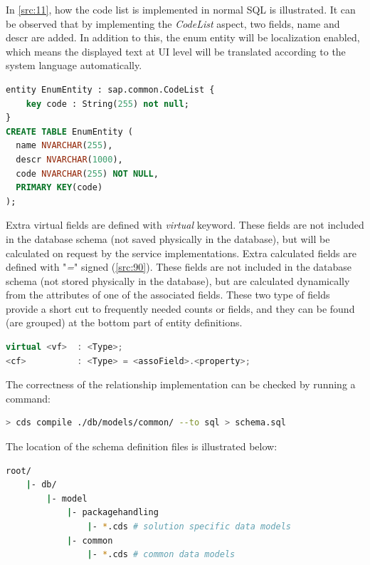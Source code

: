 In \autoref{src:11}, how the code list is implemented in normal SQL is illustrated. It can be observed that by implementing the \textit{CodeList} aspect, two fields, name and descr are added. In addition to this, the enum entity will be localization enabled, which means the displayed text at UI level will be translated according to the system language automatically.

\begin{lstlisting}[language={sql}]
entity EnumEntity : sap.common.CodeList {
    key code : String(255) not null;
}
CREATE TABLE EnumEntity (
  name NVARCHAR(255),
  descr NVARCHAR(1000),
  code NVARCHAR(255) NOT NULL,
  PRIMARY KEY(code)
);
\end{lstlisting}


Extra virtual fields are defined with \textit{virtual} keyword. These fields are not included in the database schema (not saved physically in the database), but will be calculated on request by the service implementations. 
Extra calculated fields are defined with "\textit{=}" signed (\autoref{src:90}). These fields are not included in the database schema (not stored physically in the database), but are calculated dynamically from the attributes of one of the associated fields.
These two type of fields provide a short cut to frequently needed counts or fields, and they can be found (are grouped) at the bottom part of entity definitions.

\begin{lstlisting}[language={c++}]
virtual <vf>  : <Type>;
<cf>          : <Type> = <assoField>.<property>;
\end{lstlisting}


The correctness of the relationship implementation can be checked by running a command:

\begin{lstlisting}[language={bash}]
> cds compile ./db/models/common/ --to sql > schema.sql
\end{lstlisting}

The location of the schema definition files is illustrated below:
\begin{lstlisting}[language={bash}]
root/
    |- db/
        |- model
            |- packagehandling 
                |- *.cds # solution specific data models
            |- common
                |- *.cds # common data models
\end{lstlisting}

